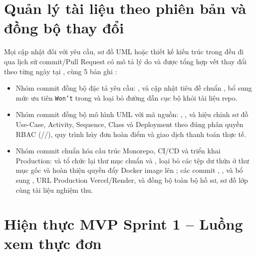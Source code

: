 \documentclass[12pt,a4paper]{report}
\begin{document}
\section{Quản lý tài liệu theo phiên bản và đồng bộ thay đổi}
Mọi cập nhật đối với yêu cầu, sơ đồ UML hoặc thiết kế kiến trúc trong  đều đi qua lịch sử commit/Pull Request có mô tả lý do và được tổng hợp vết thay đổi theo từng ngày tại ,  cùng 5 bản ghi :
\begin{itemize}[leftmargin=*]
\item Nhóm commit đồng bộ đặc tả yêu cầu: ,  và  cập nhật tiêu đề chuẩn , bổ sung mức ưu tiên \texttt{Won't} trong  và loại bỏ đường dẫn cục bộ khỏi tài liệu repo.
\item Nhóm commit đồng bộ mô hình UML với mã nguồn: , ,  và  hiệu chỉnh sơ đồ Use-Case, Activity, Sequence, Class và Deployment theo đúng phân quyền RBAC (//), quy trình hủy đơn hoàn điểm và giao dịch thanh toán thực tế.
\item Nhóm commit chuẩn hóa cấu trúc Monorepo, CI/CD và triển khai Production:  và  tổ chức lại thư mục chuẩn  và , loại bỏ các tệp  dư thừa ở thư mục gốc và hoàn thiện quyền đẩy Docker image lên ; các commit , ,  và  bổ sung , URL Production Vercel/Render, và đồng bộ toàn bộ hồ sơ, sơ đồ lớp cùng tài liệu nghiệm thu.
\end{itemize}

\section{Hiện thực MVP Sprint 1 -- Luồng xem thực đơn}
\end{document}
